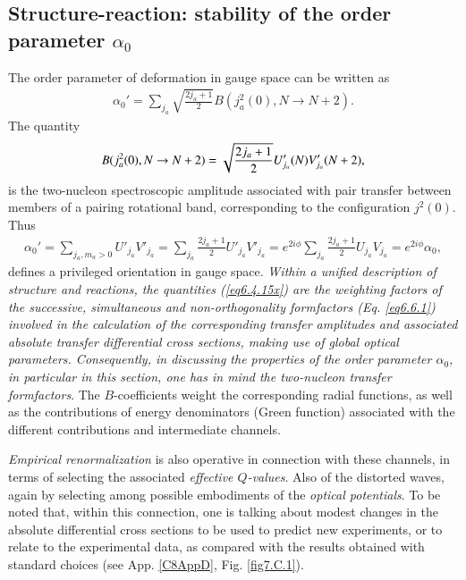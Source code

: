 \subsection{Structure-reaction: stability of the order parameter $\alpha_0$}\label{C6S2.3}
The order parameter of deformation in gauge space can be written as 
\begin{align}\label{eq7.2.1}
\alpha_0'=\sum_{j_a}\sqrt{\frac{2j_a+1}{2}}B(j^2_a(0),N\to N+2).
\end{align}
The quantity
\begin{align}\label{eq6.4.15x}
B(j^2_a(0),N\to N+2)=\sqrt{\frac{2j_a+1}{2}}U'_{j_a}(N)V'_{j_a}(N+2), \idx{Pairing rotational bands!two-nucleon transfer spectroscopic amplitudes}
\end{align}
is the two-nucleon spectroscopic amplitude associated with pair transfer between members of a pairing rotational band, corresponding to the configuration $j^2(0)$. Thus
\begin{align}\label{eq6.4.15}
\alpha_0'=\sum_{j_a,m_a>0}U'_{j_a}V'_{j_a}=\sum_{j_a}\frac{2j_a+1}{2}U'_{j_a}V'_{j_a}=e^{2i\phi}\sum_{j_a}\frac{2j_a+1}{2}U_{j_a}V_{j_a}=e^{2i\phi}\alpha_0,
\end{align}
defines a privileged orientation in gauge space. \textit{Within a unified description of structure and reactions, the quantities (\ref{eq6.4.15x}) are the weighting factors of the successive, simultaneous and non-orthogonality formfactors (Eq. \ref{eq6.6.1}) involved in the calculation of the corresponding transfer amplitudes and associated absolute transfer differential cross sections, making use of global optical parameters. Consequently, in discussing the properties of the order parameter $\alpha_0$, in particular in this section, one has in mind the two-nucleon transfer formfactors}.  The $B$-coefficients weight the corresponding radial functions, as well as the contributions of energy denominators (Green function) associated with the different contributions and intermediate channels.




 \textit{Empirical renormalization} is also operative in connection with these channels, in terms of selecting the associated \emph{effective $Q$-values}. Also of the distorted waves, again by selecting among possible embodiments of the \textit{optical potentials}. To be noted that, within this connection, one is talking about  modest changes in the absolute differential cross sections to be used to predict new experiments, or to relate to the experimental data, as compared with the results obtained with standard choices (see  App. \ref{C8AppD}, Fig. \ref{fig7.C.1}).

